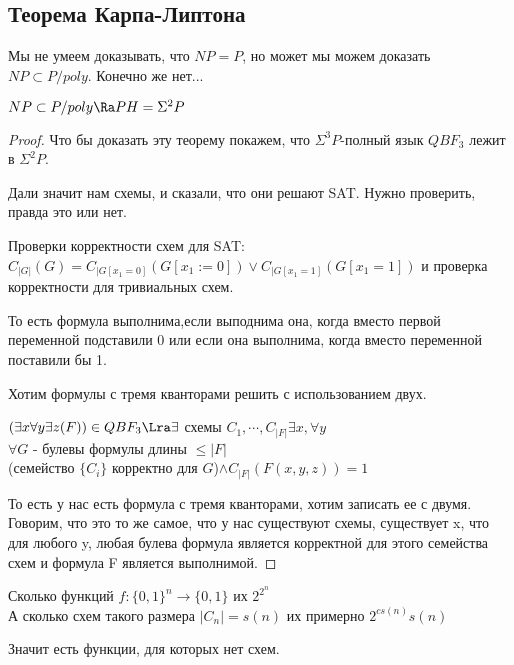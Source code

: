 \subsection{Теорема Карпа-Липтона}

Мы не умеем доказывать, что $NP = P$, но может мы можем доказать $NP \subset P/poly$. Конечно же нет...

\begin{theorem}
	$NP \subset P/poly \Ra PH = \Sigma^2P$\\
\end{theorem}
\begin{proof}
	Что бы доказать эту теорему покажем, что $\Sigma^3P$-полный язык $QBF_3$ лежит в $\Sigma^2P$.

	Дали значит нам схемы, и сказали, что они решают SAT. Нужно проверить, правда это или нет. 

	Проверки корректности схем для SAT:
	$C_{|G|}(G) = C_{|G[x_1 = 0]}(G[x_1:= 0]) \vee C_{|G[x_1 = 1]}(G[x_1 = 1])$ и проверка корректности для тривиальных схем.

	То есть формула выполнима,если выподнима она, когда вместо первой переменной подставили 0 или если она выполнима, когда вместо переменной 
	поставили бы 1. 

	Хотим формулы с тремя кванторами решить с использованием двух.
	
	$(\exists x \forall y \exists z (F)) \in QBF_3 \Lra
	\exists$ схемы $C_1, \cdots, C_{|F|} \exists x, \forall y$\\
	$\forall G$ - булевы формулы длины $\le |F|$\\
	(семейство $\{C_i\}$ корректно для $G$)$\wedge C_{|F|}(F(x,y,z)) = 1$

        То есть у нас есть формула с тремя кванторами, хотим записать ее с двумя. 
        Говорим, что это то же самое, что у нас существуют схемы, существует x, 
        что для любого y, любая булева формула является корректной для этого семейства схем и 
        формула F является выполнимой. 
\end{proof}

Сколько функций $f \colon \{0, 1\}^n \to \{0, 1\}$ их $2^{2^n}$\\
А сколько схем такого размера $|C_n| = s(n)$ их примерно $2^{cs(n)}s(n)$

Значит есть функции, для которых нет схем. 

